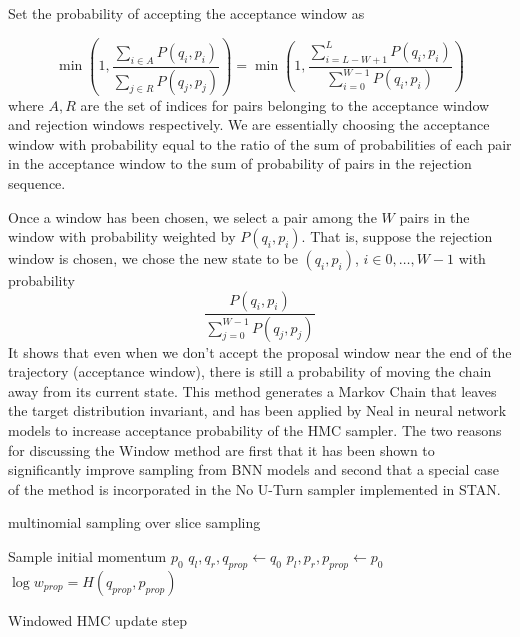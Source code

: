 \documentclass[]{report}
\begin{document}
Set the probability of accepting the acceptance window as 

\[ \min (1, \frac{\sum_{i\in A} P(q_i,p_i)}{\sum_{j \in R} P(q_j,p_j) }) = \min (1, \frac{\sum_{i=L-W+1}^L P(q_i,p_i)}{\sum_{i=0}^{W-1}P(q_i,p_i)}) \]
where $A,R$ are the set of indices for pairs belonging to the acceptance window and rejection windows respectively. We are essentially choosing the acceptance window with probability equal to the ratio of the sum of probabilities of each pair in the acceptance window to the sum of probability of pairs in the rejection sequence. 

Once a window has been chosen, we select a pair among the $W$ pairs in the window with probability weighted by $P(q_i,p_i)$. That is, suppose the rejection window is chosen, we chose the new state to be $(q_i,p_i)$, $i \in {0,\dots,W-1}$ with probability 
\[ \frac{P(q_i,p_i)}{\sum_{j=0}^{W-1} P(q_j,p_j)} \]
It shows that even when we don't accept the proposal window near the end of the trajectory (acceptance window), there is still a probability of moving the chain away from its current state. This method generates a Markov Chain that leaves the target distribution invariant, and has been applied by Neal in neural network models to increase acceptance probability of the HMC sampler\cite{neal1992improved}. The two reasons for discussing the Window method are first that it has been shown to
significantly improve sampling from BNN models and second that a special case of
the method is incorporated in the No U-Turn sampler implemented in STAN. 

multinomial sampling over slice sampling


\begin{algorithm}
Sample initial momentum $p_0$ \;
$q_l,q_r, q_{prop} \leftarrow q_0$\;
$p_l,p_r, p_{prop} \leftarrow p_0$ \;
$\log w_{prop} = H(q_{prop},p_{prop}) $ \;

\caption{Windowed HMC update step}
\end{algorithm}
\end{document}
